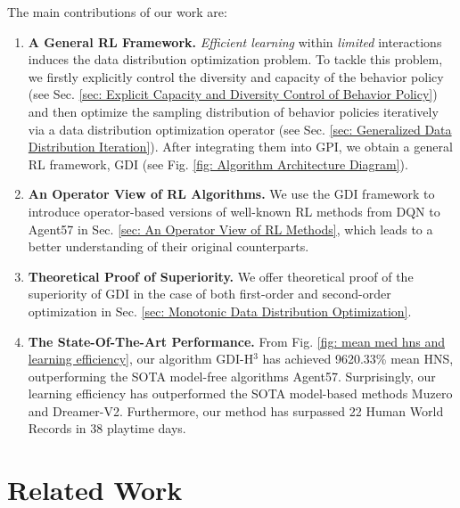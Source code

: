 \documentclass[nohyperref]{article}
\def\GDIHmeanhns{9620.33}
\newcommand{\changnan}[1]{{\color{red}{\small\bf\sf [changnan: #1]}}}
\theoremstyle{plain}
\begin{document}
The main contributions of our work are: 
\begin{enumerate}
    \item \textbf{A General RL Framework.} \emph{Efficient learning}  within \emph{limited} interactions induces the data distribution optimization problem. To tackle this problem, we firstly explicitly  control the diversity and capacity of the behavior policy (see Sec. \ref{sec: Explicit  Capacity and Diversity  Control of Behavior Policy}) and  then optimize the sampling distribution of behavior policies iteratively via a data distribution optimization operator (see Sec. \ref{sec: Generalized Data Distribution Iteration}). After integrating  them into GPI, we obtain a general RL framework, GDI (see Fig. \ref{fig: Algorithm Architecture Diagram}).
    
    \item \textbf{An Operator View of RL Algorithms.} We use the GDI framework to introduce operator-based versions of well-known RL methods from DQN to Agent57 in Sec. \ref{sec: An Operator View of RL Methods}, which leads to a better understanding of their original counterparts.

    \item \textbf{Theoretical Proof of Superiority.}  We offer theoretical proof of the superiority of GDI in the case of both first-order and second-order optimization in Sec. \ref{sec: Monotonic Data Distribution Optimization}.

    \item \textbf{The State-Of-The-Art Performance.} From Fig. \ref{fig: mean med hns and learning efficiency}, our algorithm GDI-H$^3$ has achieved \GDIHmeanhns\% mean HNS, outperforming the SOTA model-free algorithms Agent57. Surprisingly, our learning efficiency has outperformed the SOTA model-based methods Muzero and Dreamer-V2. Furthermore, our method has surpassed 22 Human World Records in 38 playtime days.
\end{enumerate}




\section{ Related Work}
\label{sec:Problem Formulation and Related Work}

\end{document}
